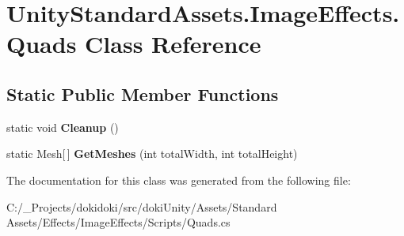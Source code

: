 \hypertarget{class_unity_standard_assets_1_1_image_effects_1_1_quads}{}\section{Unity\+Standard\+Assets.\+Image\+Effects.\+Quads Class Reference}
\label{class_unity_standard_assets_1_1_image_effects_1_1_quads}
\subsection*{Static Public Member Functions}
\begin{DoxyCompactItemize}
\item 
static void {\bfseries Cleanup} ()\hypertarget{class_unity_standard_assets_1_1_image_effects_1_1_quads_a885cb5fc635fc7c66966407af4a97ea6}{}\label{class_unity_standard_assets_1_1_image_effects_1_1_quads_a885cb5fc635fc7c66966407af4a97ea6}

\item 
static Mesh\mbox{[}$\,$\mbox{]} {\bfseries Get\+Meshes} (int total\+Width, int total\+Height)\hypertarget{class_unity_standard_assets_1_1_image_effects_1_1_quads_a6c31cbed0f5d3f850d2da956e4bdaddb}{}\label{class_unity_standard_assets_1_1_image_effects_1_1_quads_a6c31cbed0f5d3f850d2da956e4bdaddb}

\end{DoxyCompactItemize}


The documentation for this class was generated from the following file\+:\begin{DoxyCompactItemize}
\item 
C\+:/\+\_\+\+Projects/dokidoki/src/doki\+Unity/\+Assets/\+Standard Assets/\+Effects/\+Image\+Effects/\+Scripts/Quads.\+cs\end{DoxyCompactItemize}
